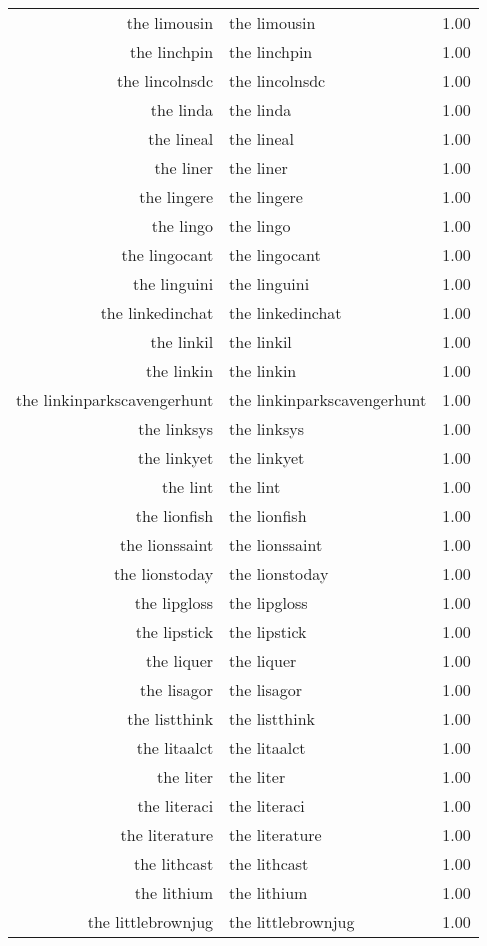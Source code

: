 \begin{table}[ht]
\begin{tabular}{rlr}
  the limousin & the limousin & 1.00 \\ 
  the linchpin & the linchpin & 1.00 \\ 
  the lincolnsdc & the lincolnsdc & 1.00 \\ 
  the linda & the linda & 1.00 \\ 
  the lineal & the lineal & 1.00 \\ 
  the liner & the liner & 1.00 \\ 
  the lingere & the lingere & 1.00 \\ 
  the lingo & the lingo & 1.00 \\ 
  the lingocant & the lingocant & 1.00 \\ 
  the linguini & the linguini & 1.00 \\ 
  the linkedinchat & the linkedinchat & 1.00 \\ 
  the linkil & the linkil & 1.00 \\ 
  the linkin & the linkin & 1.00 \\ 
  the linkinparkscavengerhunt & the linkinparkscavengerhunt & 1.00 \\ 
  the linksys & the linksys & 1.00 \\ 
  the linkyet & the linkyet & 1.00 \\ 
  the lint & the lint & 1.00 \\ 
  the lionfish & the lionfish & 1.00 \\ 
  the lionssaint & the lionssaint & 1.00 \\ 
  the lionstoday & the lionstoday & 1.00 \\ 
  the lipgloss & the lipgloss & 1.00 \\ 
  the lipstick & the lipstick & 1.00 \\ 
  the liquer & the liquer & 1.00 \\ 
  the lisagor & the lisagor & 1.00 \\ 
  the listthink & the listthink & 1.00 \\ 
  the litaalct & the litaalct & 1.00 \\ 
  the liter & the liter & 1.00 \\ 
  the literaci & the literaci & 1.00 \\ 
  the literature & the literature & 1.00 \\ 
  the lithcast & the lithcast & 1.00 \\ 
  the lithium & the lithium & 1.00 \\ 
  the littlebrownjug & the littlebrownjug & 1.00 \\ 

\end{tabular}
\end{table}

